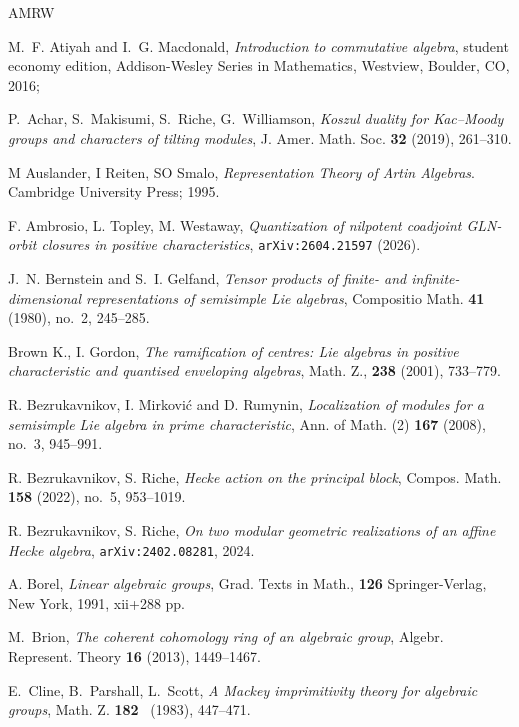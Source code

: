\documentclass[twoside,12pt,reqno]{amsart}
\theoremstyle{remark}
\numberwithin{equation}{section}
\newcommand{\arxiv}[1]{{\tt arXiv:#1}}
\begin{document}
	\begin{thebibliography}{AMRW}

M.~F. Atiyah and I.~G. Macdonald,
{\it Introduction to commutative algebra}, student economy edition, 
Addison-Wesley Series in Mathematics, Westview, Boulder, CO, 2016;

 P.~Achar, S.~Makisumi, S.~Riche, G.~Williamson, {\em Koszul duality for Kac–Moody
groups and characters of tilting modules}, J. Amer. Math. Soc. {\bf 32} (2019), 261--310.

M Auslander, I Reiten, SO Smalo, {\em Representation Theory of Artin Algebras}. Cambridge University Press; 1995.

F. Ambrosio, L. Topley, M. Westaway,
{\it Quantization of nilpotent coadjoint GLN-orbit closures in positive characteristics},
\arxiv{2604.21597} (2026).

J.~N. Bernstein and S.~I. Gelfand,
{\it Tensor products of finite- and infinite-dimensional representations of semisimple Lie algebras},
Compositio Math. {\bf 41} (1980), no.~2, 245--285.

Brown K.,  I. Gordon, {\em The ramification of centres: Lie algebras in positive characteristic and quantised enveloping algebras}, Math. Z., {\bf 238} (2001), 733--779.

R. Bezrukavnikov, I. Mirkovi\'c{} and D. Rumynin,
{\it Localization of modules for a semisimple Lie algebra in prime characteristic}, Ann. of Math. (2) {\bf 167} (2008), no.~3, 945--991.

R. Bezrukavnikov, S. Riche,
{\it Hecke action on the principal block},
Compos. Math. {\bf 158} (2022), no.~5, 953--1019.

R. Bezrukavnikov, S. Riche,
{\it On two modular geometric realizations of an affine Hecke algebra},
\arxiv{2402.08281}, 2024.

A. Borel, {\it Linear algebraic groups},
Grad. Texts in Math., {\bf 126}
Springer-Verlag, New York, 1991, xii+288 pp.

 M.~Brion,
{\em The coherent cohomology ring of an algebraic group},
Algebr. Represent. Theory {\bf 16} (2013), 1449--1467.

E.~Cline, B.~Parshall, L.~Scott,
{\em A Mackey imprimitivity theory for algebraic groups},
Math. Z. {\bf 182} \ (1983), 447--471.


\end{thebibliography}
\end{document}
